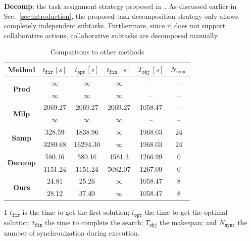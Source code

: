 \textbf{Decomp}: the task assignment strategy proposed
in~\citep{schillinger2018simultaneous}.
As discussed earlier in Sec.~\ref{sec:introduction},
the proposed task decomposition strategy only allows completely
independent subtasks.
Furthermore, since it does not support collaborative actions,
collaborative subtasks are decomposed manually.
\begin{table}[t]\footnotesize
  \centering
  \begin{threeparttable}
	\caption{Comparisons to other methods}
	\label{table:compare_time}
	\begin{tabular}{|c|c|c|c|c|c|}\hline
	   Method &  $t_{\texttt{fir}}\, [s]$
          &  $t_{\texttt{opt}}\, [s]$
	  &  $t_{\texttt{fin}}\,[s]$ & $T_{\texttt{obj}}\,[s]$
          &  $N_{\texttt{sync}}$ \\ \hline
		\multirow{2}{*}{\textbf{Prod}}& $\infty$ & $\infty$ & $\infty$ & -- & -- \\
                 & $\infty$ & $\infty$ & $\infty$ & -- & -- \\
                \hline
		\multirow{2}{*}{\textbf{Milp}} & 2069.27 & 2069.27 & 2069.27 & 1058.47 & -- \\
                &$\infty$ &$\infty$ & $\infty$ & -- & --  \\
                \hline
		\multirow{2}{*}{\textbf{Samp}} & 328.59 & 1838.96 & $\infty$ & 1968.03 & 24 \\
                 & 3280.68 &  16294.30 & $\infty$ & 1968.03 & 24 \\
                \hline
		\multirow{2}{*}{\textbf{Decomp}} & 580.16 & 580.16 & 4581.3 & 1266.99 & 0 \\
		 & 1151.24 & 1151.24 & 5082.07 & 1267.00 & 0 \\
                \hline
		\multirow{2}{*}{\textbf{Ours}} & 24.81 & 25.26 & $\infty$ & 1058.47 & 8 \\
                 & 28.12 & 37.40 & $\infty$ & 1058.47 & 8 \\
		\hline
	\end{tabular}
  \begin{tablenotes}
  \item[1] $t_\texttt{fir}$ is the time to get the first solution; $t_\texttt{opt}$ 
	the time to get the optimal solution; $t_\texttt{fin}$ the time to complete the search; $T_\texttt{obj}$ the makespan; and $N_\texttt{sync}$ the number of synchronization during execution.
  \end{tablenotes}
\end{threeparttable}
\end{table}

